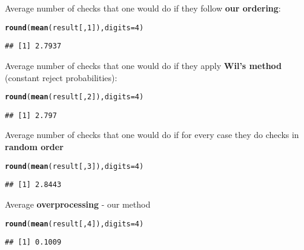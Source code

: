 \documentclass{article}\usepackage[]{graphicx}\usepackage[]{color}
\makeatletter
\newcommand{\hlnum}[1]{\textcolor[rgb]{0.686,0.059,0.569}{#1}}%
\newcommand{\hlstd}[1]{\textcolor[rgb]{0.345,0.345,0.345}{#1}}%
\newcommand{\hlkwc}[1]{\textcolor[rgb]{0.333,0.667,0.333}{#1}}%
\newcommand{\hlkwd}[1]{\textcolor[rgb]{0.737,0.353,0.396}{\textbf{#1}}}%
\newenvironment{kframe}{%
 \def\at@end@of@kframe{}%
 \ifinner\ifhmode%
  \def\at@end@of@kframe{\end{minipage}}%
  \begin{minipage}{\columnwidth}%
 \fi\fi%
 \def\FrameCommand##1{\hskip\@totalleftmargin \hskip-\fboxsep
 \colorbox{shadecolor}{##1}\hskip-\fboxsep
     \hskip-\linewidth \hskip-\@totalleftmargin \hskip\columnwidth}%
 \MakeFramed {\advance\hsize-\width
   \@totalleftmargin\z@ \linewidth\hsize
   \@setminipage}}%
 {\par\unskip\endMakeFramed%
 \at@end@of@kframe}
\newenvironment{knitrout}{}{} %
\makeatother
\begin{document}
Average number of checks that one would do if they follow \textbf{our ordering}:

\begin{knitrout}
\color{fgcolor}\begin{kframe}
\begin{alltt}
\hlkwd{round}\hlstd{(}\hlkwd{mean}\hlstd{(result[,}\hlnum{1}\hlstd{]),}\hlkwc{digits} \hlstd{=} \hlnum{4}\hlstd{)}
\end{alltt}
\begin{verbatim}
## [1] 2.7937
\end{verbatim}
\end{kframe}
\end{knitrout}

Average number of checks that one would do if they apply \textbf{Wil's method} (constant reject probabilities):

\begin{knitrout}
\color{fgcolor}\begin{kframe}
\begin{alltt}
\hlkwd{round}\hlstd{(}\hlkwd{mean}\hlstd{(result[,}\hlnum{2}\hlstd{]),}\hlkwc{digits} \hlstd{=} \hlnum{4}\hlstd{)}
\end{alltt}
\begin{verbatim}
## [1] 2.797
\end{verbatim}
\end{kframe}
\end{knitrout}

Average number of checks that one would do if for every case they do checks in \textbf{random order}

\begin{knitrout}
\color{fgcolor}\begin{kframe}
\begin{alltt}
\hlkwd{round}\hlstd{(}\hlkwd{mean}\hlstd{(result[,}\hlnum{3}\hlstd{]),}\hlkwc{digits} \hlstd{=} \hlnum{4}\hlstd{)}
\end{alltt}
\begin{verbatim}
## [1] 2.8443
\end{verbatim}
\end{kframe}
\end{knitrout}

Average \textbf{overprocessing} - our method

\begin{knitrout}
\color{fgcolor}\begin{kframe}
\begin{alltt}
\hlkwd{round}\hlstd{(}\hlkwd{mean}\hlstd{(result[,}\hlnum{4}\hlstd{]),}\hlkwc{digits} \hlstd{=} \hlnum{4}\hlstd{)}
\end{alltt}
\begin{verbatim}
## [1] 0.1009
\end{verbatim}
\end{kframe}
\end{knitrout}
\end{document}

